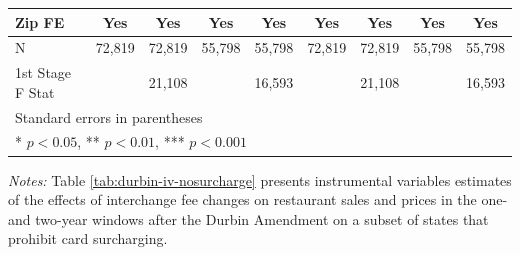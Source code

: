 \documentclass[11pt,english]{article}
\theoremstyle{remark}
\begin{document}
\begin{table}[H]
\begin{centering}
{{\begin{tabular}{l*{8}{c}}
Zip FE              &         Yes         &         Yes         &         Yes         &         Yes         &         Yes         &         Yes         &         Yes         &         Yes         \\
\midrule
N                   &      72,819         &      72,819         &      55,798         &      55,798         &      72,819         &      72,819         &      55,798         &      55,798         \\
1st Stage F Stat    &                     &      21,108         &                     &      16,593         &                     &      21,108         &                     &      16,593         \\
\bottomrule
\multicolumn{9}{l}{ Standard errors in parentheses}\\
\multicolumn{9}{l}{ * \(p<0.05\), ** \(p<0.01\), *** \(p<0.001\)}\\
\end{tabular}
}
 }
\par\end{centering}
\par\textit{Notes: } Table \ref{tab:durbin-iv-nosurcharge}
presents instrumental variables estimates of the effects of interchange fee changes on restaurant sales and prices in the one- and two-year windows after the Durbin Amendment on a subset of states that prohibit card surcharging.
\end{table}
\end{document}

